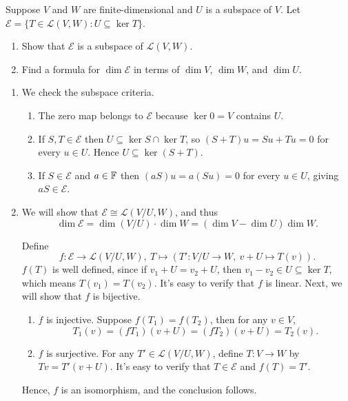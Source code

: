 \documentclass{article}
\begin{document}
\begin{problem}[3D-10]
    Suppose $V$ and $W$ are finite-dimensional and $U$ is a subspace of $V$. Let
    $\mathcal{E}=\{T\in\mathcal{L}(V,W):U\subseteq\ker T\}$.
    \begin{enumerate}[label=(\alph*)]
        \item Show that $\mathcal{E}$ is a subspace of $\mathcal{L}(V,W)$.
        \item Find a formula for $\dim\mathcal{E}$ in terms of $\dim V$, $\dim W$, and $\dim U$.
    \end{enumerate}
\end{problem}

\begin{solution}
\begin{enumerate}[label=(\alph*)]
    \item We check the subspace criteria. 
    \begin{enumerate}[label=(\arabic*)]
        \item The zero map belongs to \( \mathcal{E} \) because \( \ker 0=V \) contains \( U \).
        \item If \( S,T\in\mathcal{E} \) then \( U\subseteq\ker S\cap\ker T \), so \( (S+T)u=Su+Tu=0 \) for every \( u\in U \). Hence \( U\subseteq\ker(S+T) \).
        \item If \( S\in\mathcal{E} \) and \( a\in\mathbb{F} \) then \( (aS)u=a(Su)=0 \) for every \( u\in U \), giving \( aS\in\mathcal{E} \).
    \end{enumerate}
    \item We will show that \( \mathcal{E}\cong \mathcal{L}(V/U,W) \), and thus
    \[ \dim\mathcal{E}=\dim(V/U)\cdot\dim W=(\dim V-\dim U)\dim W. \]\par
    Define
    \[ f:\mathcal{E}\to \mathcal{L}(V/U,W),\ T\mapsto \left(T':V/U\to W,\ v+U\mapsto T(v)\right). \] 
    \( f(T) \) is well defined, since if \( v_1+U=v_2+U \), then \( v_1-v_2\in U\subseteq\ker T \), which means \( T(v_1)=T(v_2) \). It's easy to verify that \( f  \) is linear. Next, we will show that \( f  \) is bijective. \par
    \begin{enumerate}[label=(\arabic*)]
    \item \( f \) is injective. Suppose \( f(T_1)=f(T_2) \), then for any \( v\in V \), 
    \[ T_1(v)=(fT_1)(v+U)=(fT_2)(v+U)=T_2(v). \]
    \item \( f \) is surjective. For any \( T'\in\mathcal{L}(V/U,W) \), define \( T:V\to W \) by \( Tv=T'(v+U) \). It's easy to verify that \( T\in\mathcal{E} \) and \( f(T)=T' \).
    \end{enumerate}
    Hence, \( f  \) is an isomorphism, and the conclusion follows.
\end{enumerate}
\end{solution}
\end{document}

